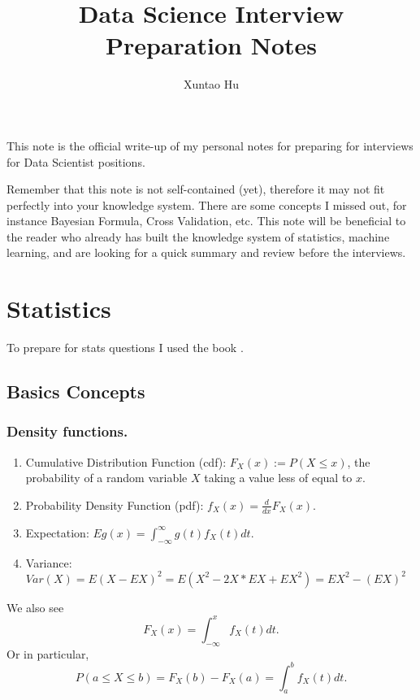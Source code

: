 \documentclass[12pt]{amsart}
\numberwithin{equation}{section}
\theoremstyle{plain}
\theoremstyle{definition}
\begin{document}
\title{Data Science Interview\\Preparation Notes}
\author{Xuntao Hu}
\address{Mathematics Department, Stony Brook University,
Stony Brook, NY 11794-3651, USA}
\email{}

\maketitle
\tableofcontents

This note is the official write-up of my personal notes for preparing for interviews for Data Scientist positions. 

Remember that this note is not self-contained (yet), therefore it may not fit perfectly into your knowledge system. There are some concepts I missed out, for instance Bayesian Formula, Cross Validation, etc. This note will be beneficial to the reader who already has built the knowledge system of statistics, machine learning, and are looking for a quick summary and review before the interviews.


\section{Statistics}

To prepare for stats questions I used the book \cite{SI}.

\subsection{Basics Concepts}
\subsubsection{Density functions.}
\begin{enumerate}
\item Cumulative Distribution Function (cdf): $F_X(x):= P(X\leq x)$, the probability of a random variable $X$ taking a value less of equal to $x$.
\item Probability Density Function (pdf): $f_X(x) = \frac{d}{dx}F_X(x)$.
\item Expectation: $Eg(x) = \int_{-\infty}^\infty g(t)f_X(t)dt$.
\item Variance: $Var(X) = E(X-EX)^2 = E(X^2-2X*EX+EX^2)=EX^2-(EX)^2$
\end{enumerate}
We also see 
$$F_X(x) = \int_{-\infty}^xf_X(t)dt.$$ 
Or in particular, 
$$P(a\leq X \leq b)=F_X(b)-F_X(a)=\int_a^bf_X(t)dt.$$
\end{document}
